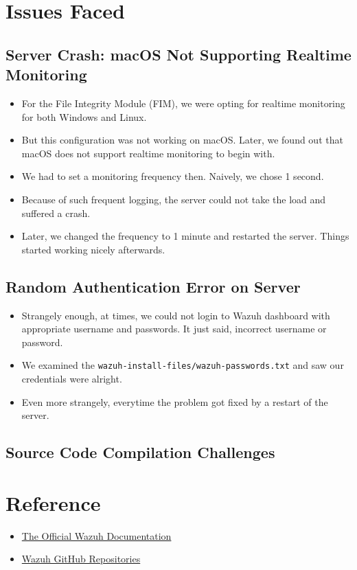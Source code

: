 \section{Issues Faced}
\subsection{Server Crash: macOS Not Supporting Realtime Monitoring}
\begin{itemize}
    \item For the File Integrity Module (FIM), we were opting for realtime monitoring for both Windows and Linux.
    \item But this configuration was not working on macOS. Later, we found out that macOS does not support realtime monitoring to begin with.
    \item We had to set a monitoring frequency then. Naively, we chose 1 second.
    \item Because of such frequent logging, the server could not take the load and suffered a crash.
    \item Later, we changed the frequency to 1 minute and restarted the server. Things started working nicely afterwards.
\end{itemize} 

\subsection{Random Authentication Error on Server}
\begin{itemize}
    \item Strangely enough, at times, we could not login to Wazuh dashboard with appropriate username and passwords. It just said, incorrect username or password.
    \item We examined the \texttt{wazuh-install-files/wazuh-passwords.txt} and saw our credentials were alright.
    \item Even more strangely, everytime the problem got fixed by a restart of the server.
\end{itemize}

\subsection{Source Code Compilation Challenges}

\section{Reference}
\begin{itemize}
    \item \href{https://documentation.wazuh.com}{The Official Wazuh Documentation}
    \item \href{https://github.com/wazuh}{Wazuh GitHub Repositories}
\end{itemize}